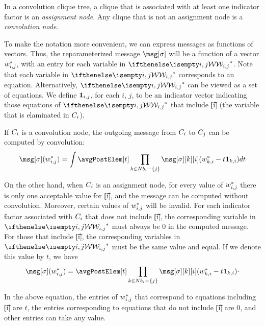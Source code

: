 \begin{definition}
    In a convolution clique tree, a clique that is associated with at least one indicator factor is an
    \emph{assignment node}.
    Any clique that is not an assignment node is a \emph{convolution node}.
\end{definition}

To make the notation more convenient, we can express messages as functions of vectors.
Thus, the reparameterized message $\msg[\altMsgSym]$ will be a function of a vector $w^{*}_{i, j}$, with an entry for
each variable in $\wSep$.
Note that each variable in $\wSep$ corresponds to an equation.
Alternatively, $\wSep$ can be viewed as a set of equations.
We define $\mathbf{1}_{i, j}$, for each $i$, $j$, to be an indicator vector indicating those equations of $\wSep$ that
include \t[i] (the variable that is elaminated in $C_{i}$).

If $C_{i}$ is a convolution node, the outgoing message from $C_{i}$ to $C_{j}$ can be computed by convolution:
\begin{equation*}
    \msg[\altMsgSym](\wSepVal{i}{j}) =
    \int \avgPostElem[t] \prod_{k \in \Nb - \{j\}} \msg[\altMsgSym][k][i](\wSepVal{k}{i} - t \indVec{k}{i}) dt
\end{equation*}

On the other hand, when $C_{i}$ is an assignment node, for every value of $w^{*}_{i, j}$ there is only one acceptable
value for \t[i], and the message can be computed without convolution.
Moreover, certain values of $w^{*}_{i, j}$ will be invalid.
For each indicator factor associated with $C_{i}$ that does not include \t[i], the corresponding variable in $\wSep$
must always be $0$ in the computed message.
For those that include \t[i], the corresponding variables in $\wSep$ must be the same value and equal.
If we denote this value by $t$, we have
\begin{equation*}
    \msg[\altMsgSym](\wSepVal{i}{j}) =
    \avgPostElem[t] \prod_{k \in \Nb - \{j\}} \msg[\altMsgSym][k][i](\wSepVal{k}{i} - t \indVec{k}{i}) \cdot
\end{equation*}

In the above equation, the entries of $w^{*}_{i, j}$ that correspond to equations including \t[i] are $t$,
the entries corresponding to equations that do not include \t[i] are $0$,
and other entries can take any value.
